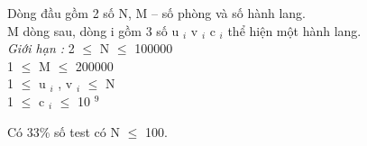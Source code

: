 Dòng đầu gồm 2 số N, M – số phòng và số hành lang.   
\\   M dòng sau, dòng i gồm 3 số u   $_    i   $   v   $_    i   $   c   $_    i   $   thể hiện một hành lang.   
\\\emph{    Giới hạn :   }   2  $\le$  N  $\le$  100000   
\\   1  $\le$  M  $\le$  200000   
\\   1  $\le$  u   $_    i   $   , v   $_    i   $    $\le$  N   
\\   1  $\le$  c   $_    i   $    $\le$  10   $^    9   $

   Có 33\% số test có N  $\le$  100.  

\